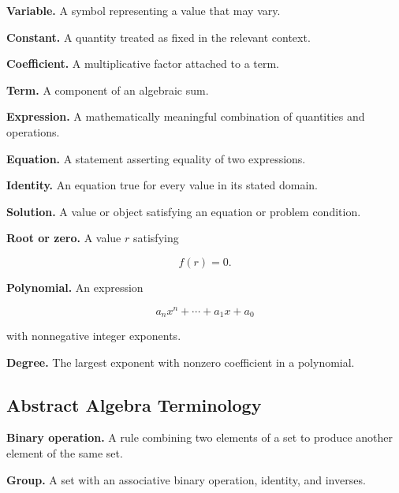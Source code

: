 \textbf{Variable.}
A symbol representing a value that may vary.

\medskip

\textbf{Constant.}
A quantity treated as fixed in the relevant context.

\medskip

\textbf{Coefficient.}
A multiplicative factor attached to a term.

\medskip

\textbf{Term.}
A component of an algebraic sum.

\medskip

\textbf{Expression.}
A mathematically meaningful combination of quantities and operations.

\medskip

\textbf{Equation.}
A statement asserting equality of two expressions.

\medskip

\textbf{Identity.}
An equation true for every value in its stated domain.

\medskip

\textbf{Solution.}
A value or object satisfying an equation or problem condition.

\medskip

\textbf{Root or zero.}
A value \(r\) satisfying

\[
\boxed{
f(r)=0.
}
\]

\medskip

\textbf{Polynomial.}
An expression

\[
\boxed{
a_nx^n+\cdots+a_1x+a_0
}
\]

with nonnegative integer exponents.

\medskip

\textbf{Degree.}
The largest exponent with nonzero coefficient in a polynomial.

\subsection{Abstract Algebra Terminology}
\label{subsec:abstract-algebra-terminology}

\textbf{Binary operation.}
A rule combining two elements of a set to produce another element of the
same set.

\medskip

\textbf{Group.}
A set with an associative binary operation, identity, and inverses.

